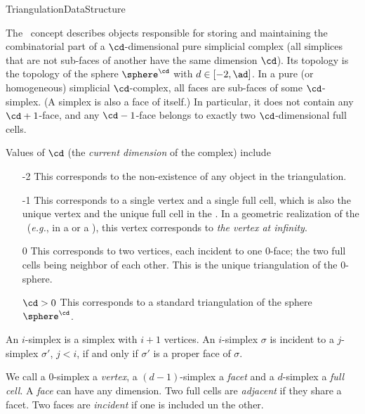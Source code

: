 \begin{ccRefConcept}{TriangulationDataStructure}

\ccDefinition

The \ccRefName\ concept describes objects responsible for storing and
maintaining the combinatorial part of a
$\cd$-dimensional pure simplicial complex (all simplices that are not
sub-faces of another have the same dimension $\cd$).
Its topology is the topology
of the sphere  $\sphere^\cd$ with $d\in[-2,\ad]$.
 In a  pure (or homogeneous) simplicial $\cd$-complex, all
 faces are sub-faces of some $\cd$-simplex. (A
simplex is also a face of itself.) In particular, it does not
contain any $\cd+1$-face, and any $\cd-1$-face belongs to exactly
two $\cd$-dimensional {full cells}. 

Values of $\cd$ (the \emph{current dimension} of the complex) include \begin{itemize}

\item[-2] This corresponds to the non-existence of any object in
the triangulation.

\item[-1] This corresponds to a single vertex and a single full cell,
  which is also the unique vertex and the unique full cell in the
  . 
 In a
geometric realization of the \ccRefName\ (\emph{e.g.}, in a
 or a
), this vertex
corresponds to \emph{the vertex at infinity}.

\item[0] This corresponds to two vertices, each incident to one $0$-face;
the two full cells being neighbor of each other. This is the unique
triangulation of the $0$-sphere.

\item[$\cd>0$] This corresponds to a standard triangulation of the sphere
$\sphere^\cd$.
\end{itemize}

An $i$-simplex is a simplex with $i+1$ vertices. An $i$-simplex $\sigma$ is
{incident} to a $j$-simplex $\sigma'$, $j<i$, if and only if $\sigma'$
is a proper face of $\sigma$. 

We call a $0$-simplex a {\em vertex}, a $(d-1)$-simplex a {\em facet} and a
$d$-simplex a {\em full cell}. A {\em face} can have any dimension.
Two full cells are {\em adjacent} if they share a facet. Two faces are
{\em incident} if one is included un the other.



\end{ccRefConcept}
